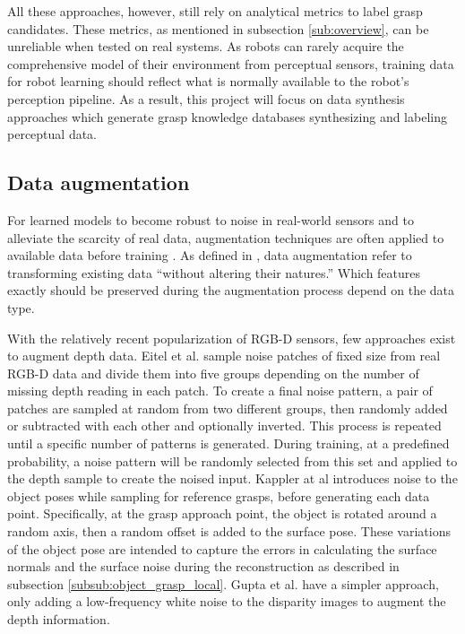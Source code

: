 All these approaches, however, still rely on analytical metrics to label grasp candidates. These metrics, as mentioned
in subsection \ref{sub:overview}, can be unreliable when tested on real systems. As robots can rarely acquire the
comprehensive model of their environment from perceptual sensors, training data for robot learning should reflect what
is normally available to the robot's perception pipeline. As a result, this project will focus on data synthesis
approaches which generate grasp knowledge databases synthesizing and labeling perceptual data.

\subsection{Data augmentation}

For learned models to become robust to noise in real-world sensors and to alleviate the scarcity of real data,
augmentation techniques are often applied to available data before training
\cite{Eitel2015,Kappler2015,Gupta2014RGBDFeatures}. As defined in \cite{Gu2018}, data augmentation refer to transforming
existing data ``without altering their natures.'' Which features exactly should be preserved during the augmentation
process depend on the data type.

With the relatively recent popularization of RGB-D sensors, few approaches exist to augment depth data. Eitel et al.
\cite{Eitel2015} sample noise patches of fixed size from real RGB-D data and divide them into five groups depending on
the number of missing depth reading in each patch. To create a final noise pattern, a pair of patches are sampled at
random from two different groups, then randomly added or subtracted with each other and optionally inverted. This
process is repeated until a specific number of patterns is generated. During training, at a predefined probability,
a noise pattern will be randomly selected from this set and applied to the depth sample to create the noised input.
Kappler at al \cite{Kappler2015} introduces noise to the object poses while sampling for reference grasps, before
generating each data point. Specifically, at the grasp approach point, the object is rotated around a random axis, then
a random offset is added to the surface pose. These variations of the object pose are intended to capture the errors in
calculating the surface normals and the surface noise during the reconstruction as described in subsection
\ref{subsub:object_grasp_local}. Gupta et al. \cite{Gupta2014RGBDFeatures} have a simpler approach, only adding a
low-frequency white noise to the disparity images to augment the depth information.

